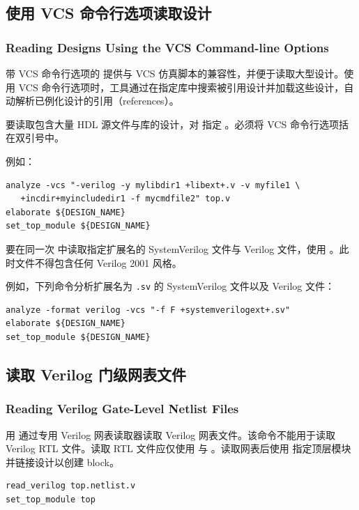 \subsection{使用 VCS 命令行选项读取设计}
\subsubsection*{Reading Designs Using the VCS Command-line Options}

带 VCS 命令行选项的  提供与 VCS 仿真脚本的兼容性，并便于读取大型设计。使用 VCS 命令行选项时，工具通过在指定库中搜索被引用设计并加载这些设计，自动解析已例化设计的引用（references）。

要读取包含大量 HDL 源文件与库的设计，对  指定 。必须将 VCS 命令行选项括在双引号中。

例如：
\begin{lstlisting}
analyze -vcs "-verilog -y mylibdir1 +libext+.v -v myfile1 \
   +incdir+myincludedir1 -f mycmdfile2" top.v
elaborate ${DESIGN_NAME}
set_top_module ${DESIGN_NAME}
\end{lstlisting}

要在同一次  中读取指定扩展名的 SystemVerilog 文件与 Verilog 文件，使用 。此时文件不得包含任何 Verilog 2001 风格。

例如，下列命令分析扩展名为 \texttt{.sv} 的 SystemVerilog 文件以及 Verilog 文件：
\begin{lstlisting}
analyze -format verilog -vcs "-f F +systemverilogext+.sv"
elaborate ${DESIGN_NAME}
set_top_module ${DESIGN_NAME}
\end{lstlisting}

\subsection{读取 Verilog 门级网表文件}
\subsubsection*{Reading Verilog Gate-Level Netlist Files}

用  通过专用 Verilog 网表读取器读取 Verilog 网表文件。该命令不能用于读取 Verilog RTL 文件。读取 RTL 文件应仅使用  与 。读取网表后使用  指定顶层模块并链接设计以创建 block。
\begin{lstlisting}
read_verilog top.netlist.v
set_top_module top
\end{lstlisting}

